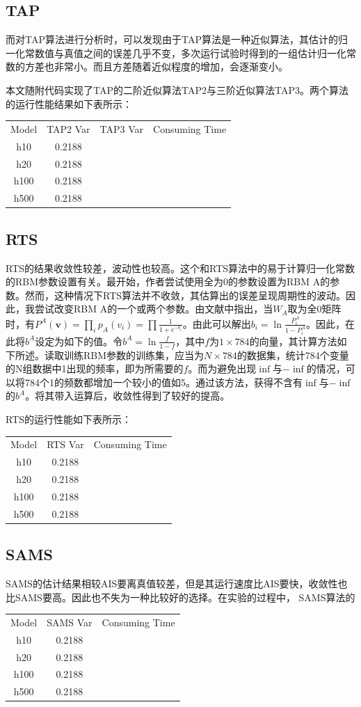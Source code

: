 \documentclass[journal,a4paper]{IEEEtran}
\begin{document}
	\subsection{TAP}
		而对TAP算法进行分析时，可以发现由于TAP算法是一种近似算法，其估计的归一化常数值与真值之间的误差几乎不变，多次运行试验时得到的一组估计归一化常数的方差也非常小。而且方差随着近似程度的增加，会逐渐变小。
		
		本文随附代码实现了TAP的二阶近似算法TAP2与三阶近似算法TAP3。两个算法的运行性能结果如下表所示：
		\begin{tabular}{cccc}
			Model & TAP2 Var & TAP3 Var & Consuming Time \\
			h10 & 0.2188 & & \\
			h20 & 0.2188 & & \\
			h100 & 0.2188 & & \\
			h500 & 0.2188 & & \\
		\end{tabular}


	\subsection{RTS}
		RTS的结果收敛性较差，波动性也较高。这个和RTS算法中的易于计算归一化常数的RBM参数设置有关。最开始，作者尝试使用全为0的参数设置为RBM A的参数。然而，这种情况下RTS算法并不收敛，其估算出的误差呈现周期性的波动。因此，我尝试改变RBM A的一个或两个参数。由文献\cite{salakhutdinov2009learning}中指出，当$W_A$取为全0矩阵时，有$P^A(\mathbf{v})=\prod_ip_A(v_i)=\prod\frac{1}{1+e^{-b_i}}$。由此可以解出$b_i = \ln \frac{P_i^A}{1-P_i^A}$。因此，在此将$b^A$设定为如下的值。令$b^A=\ln \frac{f}{1-f}$，其中$f$为$1\times784$的向量，其计算方法如下所述。读取训练RBM参数的训练集，应当为$N\times784$的数据集，统计784个变量的N组数据中1出现的频率，即为所需要的$f$。而为避免出现$\inf$与$-\inf$的情况，可以将784个1的频数都增加一个较小的值如5。通过该方法，获得不含有$\inf$与$-\inf$的$b^A$。将其带入运算后，收敛性得到了较好的提高。
		
		RTS的运行性能如下表所示：
		\begin{tabular}{ccc}
			Model & RTS Var & Consuming Time \\
			h10 & 0.2188 & \\
			h20 & 0.2188 & \\
			h100 & 0.2188 & \\
			h500 & 0.2188 & \\
		\end{tabular}
		
	\subsection{SAMS}
		SAMS的估计结果相较AIS要离真值较差，但是其运行速度比AIS要快，收敛性也比SAMS要高。因此也不失为一种比较好的选择。在实验的过程中，
		SAMS算法的
		\begin{tabular}{ccc}
			Model & SAMS Var & Consuming Time \\
			h10 & 0.2188 & \\
			h20 & 0.2188 & \\
			h100 & 0.2188 & \\
			h500 & 0.2188 & \\
		\end{tabular}
\end{document}

